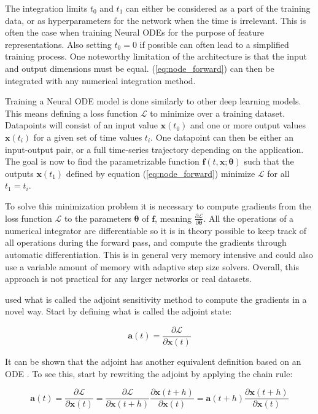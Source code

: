 \documentclass[12pt,a4paper]{book}
\begin{document}
The integration limits $t_0$ and $t_1$ can either be considered as a part of the training data, or as hyperparameters for the network when the time is irrelevant. This is often the case when training Neural ODEs for the purpose of feature representations. Also setting $t_0 = 0$ if possible can often lead to a simplified training process. One noteworthy limitation of the architecture is that the input and output dimensions must be equal. (\ref{eq:node_forward}) can then be integrated with any numerical integration method.

Training a Neural ODE model is done similarly to other deep learning models. This means defining a loss function $\mathcal{L}$ to minimize over a training dataset. Datapoints will consist of an input value $\bm{x}(t_0)$ and one or more output values $\bm{x}(t_i)$ for a given set of time values $t_i$. One datapoint can then be either an input-output pair, or a full time-series trajectory depending on the application. The goal is now to find the parametrizable function $\bm{f}(t, \bm{x}; \bm{\theta})$ such that the outputs $\bm{x}(t_1)$ defined by equation (\ref{eq:node_forward}) minimize $\mathcal{L}$ for all $t_1 = t_i$.

To solve this minimization problem it is necessary to compute gradients from the loss function $\mathcal{L}$ to the parameters $\bm{\theta}$ of $\bm{f}$, meaning $\frac{\partial \mathcal{L}}{\partial \bm{\theta}}$. All the operations of a numerical integrator are differentiable so it is in theory possible to keep track of all operations during the forward pass, and compute the gradients through automatic differentiation. This is in general very memory intensive and could also use a variable amount of memory with adaptive step size solvers. Overall, this approach is not practical for any larger networks or real datasets.

\cite{node} used what is called the adjoint sensitivity method \citep{pontryagin62} to compute the gradients in a novel way. Start by defining what is called the adjoint state:

\begin{equation}
    \bm{a}(t) = \frac{\partial \mathcal{L}}{\partial \bm{x}(t)}
\end{equation}

It can be shown that the adjoint has another equivalent definition based on an ODE \citep{node}. To see this, start by rewriting the adjoint by applying the chain rule:

\begin{equation*}
    \bm{a}(t) = \frac{\partial \mathcal{L}}{\partial \bm{x}(t)} = \frac{\partial \mathcal{L}}{\partial \bm{x}(t + h)} \frac{\partial \bm{x}(t+h)}{\partial \bm{x}(t)} = \bm{a}(t+h) \frac{\partial \bm{x}(t+h)}{\partial \bm{x}(t)}
\end{equation*}
\end{document}
